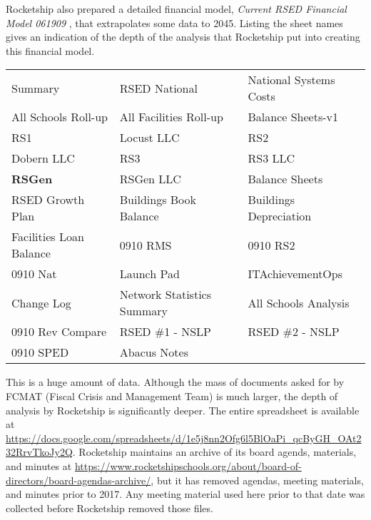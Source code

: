 Rocketship also prepared a detailed financial model, \textit{Current RSED Financial Model 061909} \parencite{RSED2009a}, that extrapolates some data to 2045. Listing the sheet names gives an indication of the depth of the analysis that Rocketship put into creating this financial model. 
\begin{table}[ht]
    \begin{tabular}{lll}
      Summary & RSED National & National Systems Costs \\
      All Schools Roll-up & All Facilities Roll-up & Balance Sheets-v1\\
      RS1 & Locust LLC & RS2 \\
      Dobern LLC & RS3 & RS3 LLC \\
      \textbf{RSGen} & RSGen LLC & Balance Sheets \\
      RSED Growth Plan & Buildings Book Balance & Buildings Depreciation \\
      Facilities Loan Balance & 0910 RMS & 0910 RS2 \\
      0910 Nat & Launch Pad & ITAchievementOps \\
      Change Log & Network Statistics Summary & All Schools Analysis\\
      0910 Rev Compare & RSED \#1  - NSLP & RSED \#2 - NSLP\\
      0910 SPED &  Abacus Notes \\
  \end{tabular}
\end{table}

This is a huge amount of data. Although the mass of documents asked for by FCMAT (Fiscal Crisis and Management Team) is much larger, the depth of analysis by Rocketship is significantly deeper. The entire spreadsheet is available at \url{https://docs.google.com/spreadsheets/d/1e5j8nn2Ofg6l5BlOaPi_qcByGH_OAt232RrvTkoJy2Q}. Rocketship maintains an archive of its board agends, materials, and minutes at \url{https://www.rocketshipschools.org/about/board-of-directors/board-agendas-archive/}, but it has removed agendas, meeting materials, and minutes prior to 2017. Any meeting material used here prior to that date was collected before Rocketship removed those files.

